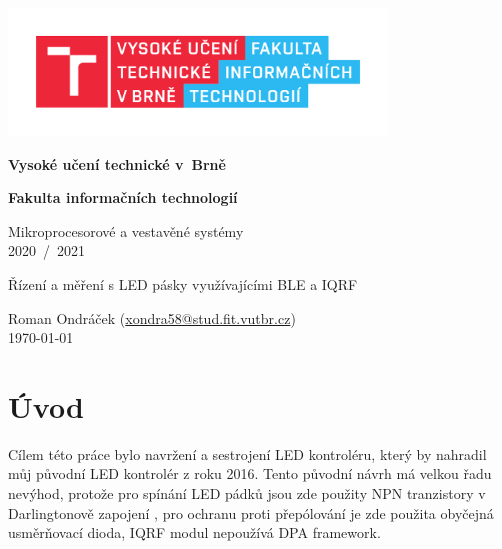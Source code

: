 \documentclass[12pt]{article}
\begin{document}
	\begin{titlepage}
		\begin{center}
			\includegraphics[height = 96pt]{img/FIT_barevne_CMYK_CZ.pdf} \\

			\begin{LARGE}
				\textbf{Vysoké učení technické v~Brně} \\
			\end{LARGE}

			\begin{Large}
				\textbf{Fakulta informačních technologií} \\
			\end{Large}

			\begin{large}
				Mikroprocesorové a vestavěné systémy \\
				2020~/~2021
			\end{large}


			\begin{huge}
				Řízení a měření s LED pásky využívajícími BLE a IQRF \\
			\end{huge}


			\begin{large}
				Roman Ondráček (\href{mailto:xondra58@stud.fit.vutbr.cz}{xondra58@stud.fit.vutbr.cz}) \\
				\today
			\end{large}
		\end{center}
	\end{titlepage}

	\section{Úvod}

	Cílem této práce bylo navržení a sestrojení LED kontroléru, který by nahradil můj původní LED kontrolér z roku 2016\cite{led-controller}. Tento původní návrh má velkou řadu nevýhod, protože pro spínání LED pádků jsou zde použity NPN tranzistory v Darlingtonově zapojení , pro ochranu proti přepólování je zde použita obyčejná usměrňovací dioda, IQRF modul nepoužívá DPA framework.
\end{document}
